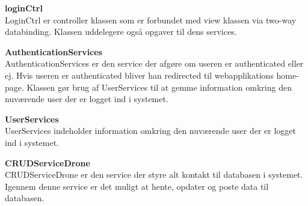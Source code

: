 \textbf{loginCtrl} \\
LoginCtrl er controller klassen som er forbundet med view klassen via two-way databinding. Klassen uddelegere også opgaver til dens services.

\textbf{AuthenticationServices} \\
AuthenticationServices er den service der afgøre om useren er authenticated eller ej. Hvis useren er authenticated bliver han redirected til webapplikations home-page. Klassen gør brug af UserServices til at gemme information omkring den nuværende user der er logget ind i systemet.

\textbf{UserServices}\\
UserServices indeholder information omkring den nuværende user der er logget ind i systemet.

\textbf{CRUDServiceDrone} \\
CRUDServiceDrone er den service der styre alt kontakt til databasen i systemet. Igennem denne service er det muligt at hente, opdater og poste data til databasen.